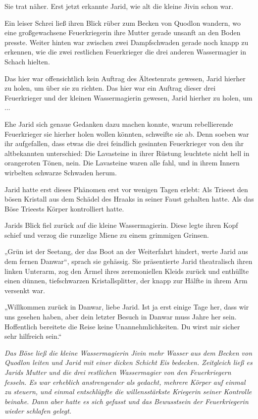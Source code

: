 Sie trat näher. Erst jetzt erkannte Jarid, wie alt die kleine Jivin schon war.

Ein leiser Schrei ließ ihren Blick rüber zum Becken von Quodlon wandern, wo eine großgewachsene Feuerkriegerin ihre Mutter gerade unsanft an den Boden presste. Weiter hinten war zwischen zwei Dampfschwaden gerade noch knapp zu erkennen, wie die zwei restlichen Feuerkrieger die drei anderen Wassermagier in Schach hielten.

Das hier war offensichtlich kein Auftrag des Ältestenrats gewesen, Jarid hierher zu holen, um über sie zu richten. Das hier war ein Auftrag dieser drei Feuerkrieger und der kleinen Wassermagierin gewesen, Jarid hierher zu holen, um ...

Ehe Jarid sich genaue Gedanken dazu machen konnte, warum rebellierende Feuerkrieger sie hierher holen wollen könnten, schweifte sie ab. Denn soeben war ihr aufgefallen, dass etwas die drei feindlich gesinnten Feuerkrieger von den ihr altbekannten unterschied: Die Lavasteine in ihrer Rüstung leuchtete nicht hell in orangeroten Tönen, nein. Die Lavasteine waren alle fahl, und in ihrem Innern wirbelten schwarze Schwaden herum.

Jarid hatte erst dieses Phänomen erst vor wenigen Tagen erlebt: Als Trieest den bösen Kristall aus dem Schädel des Hraaks in seiner Faust gehalten hatte. Als das Böse Trieests Körper kontrolliert hatte.

Jarids Blick fiel zurück auf die kleine Wassermagierin. Diese legte ihren Kopf schief und verzog die runzelige Miene zu einem grimmigen Grinsen.

„Grün ist der Seetang, der das Boot an der Weiterfahrt hindert, werte Jarid aus dem fernen Danwar“, sprach sie gehässig. Sie präsentierte Jarid theatralisch ihren linken Unterarm, zog den Ärmel ihres zeremoniellen Kleids zurück und enthüllte einen dünnen, tiefschwarzen Kristallsplitter, der knapp zur Hälfte in ihrem Arm versenkt war.

„Willkommen zurück in Danwar, liebe Jarid. Ist ja erst einige Tage her, dass wir uns gesehen haben, aber dein letzter Besuch in Danwar muss Jahre her sein. Hoffentlich bereitete die Reise keine Unannehmlichkeiten. Du wirst mir sicher sehr hilfreich sein.“



\trennzeichen



\textit{Das Böse ließ die kleine Wassermagierin Jivin mehr Wasser aus dem Becken von Quodlon leiten und Jarid mit einer dicken Schicht Eis bedecken. Zeitgleich ließ es Jarids Mutter und die drei restlichen Wassermagier von den Feuerkriegern fesseln. Es war erheblich anstrengender als gedacht, mehrere Körper auf einmal zu steuern, und einmal entschlüpfte die willensstärkste Kriegerin seiner Kontrolle beinahe. Dann aber hatte es sich gefasst und das Bewusstsein der Feuerkriegerin wieder schlafen gelegt.}

